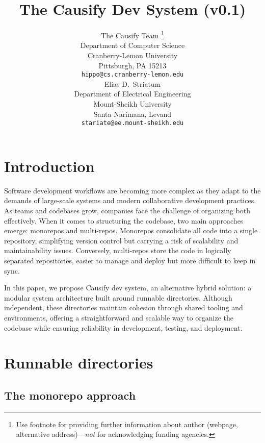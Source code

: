\documentclass{article}
\title{The Causify Dev System (v0.1)}
\author{ The Causify Team
\thanks{Use footnote for providing further information about author (webpage,
alternative address)---\emph{not} for acknowledging funding agencies.} \\
Department of Computer Science\\
Cranberry-Lemon University\\
Pittsburgh, PA
15213
\\ \texttt{hippo@cs.cranberry-lemon.edu} \\
\And
Elias D.~Striatum \\
Department of Electrical Engineering\\
Mount-Sheikh University\\
Santa Narimana, Levand \\
\texttt{stariate@ee.mount-sheikh.edu} \\
}
\begin{document}
  \maketitle

  \begin{abstract}
  \end{abstract}


  \section{Introduction}
  Software development workflows are becoming more complex as they adapt to the
  demands of large-scale systems and modern collaborative development practices.
  As teams and codebases grow, companies face the challenge of organizing both
  effectively. When it comes to structuring the codebase, two main approaches
  emerge: monorepos and multi-repos. Monorepos consolidate all code into a
  single repository, simplifying version control but carrying a risk of
  scalability and maintainability issues. Conversely, multi-repos store the code
  in logically separated repositories, easier to manage and deploy but more
  difficult to keep in sync.

  In this paper, we propose Causify dev system, an alternative hybrid solution: a
  modular system architecture built around runnable directories. Although
  independent, these directories maintain cohesion through shared tooling and
  environments, offering a straightforward and scalable way to organize the
  codebase while ensuring reliability in development, testing, and deployment.


  \section{Runnable directories}

  \subsection{The monorepo approach}
\end{document}
